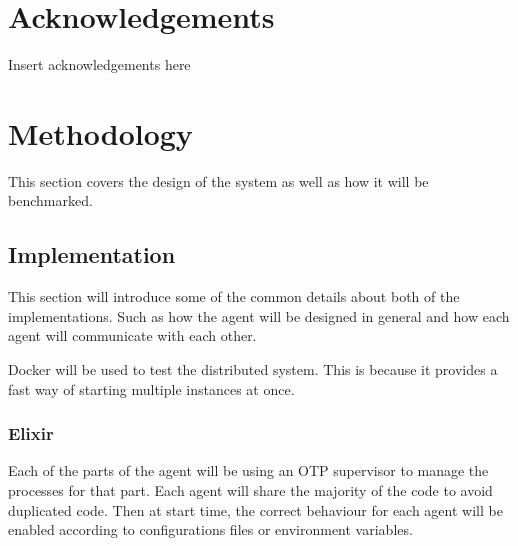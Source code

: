 \documentclass[12pt,a4paper]{article}
\begin{document}

\pagebreak

\pagebreak

\pagebreak

\begin{abstract}
\end{abstract}
\pagebreak

\tableofcontents
\newpage

\listoffigures
\newpage

\renewcommand\lstlistlistingname{List of Listings}
\lstlistoflistings{}
\newpage

\listoftables
\newpage

\section*{Acknowledgements}
Insert acknowledgements here
\subsection*{}
\newpage





\section{Methodology}

This section covers the design of the system as well as how it will be benchmarked.

\subsection{Implementation}

This section will introduce some of the common details about both of the implementations.
Such as how the agent will be designed in general and how each agent will communicate with each other.

Docker will be used to test the distributed system.
This is because it provides a fast way of starting multiple instances at once.

\subsubsection{Elixir}

Each of the parts of the agent will be using an OTP supervisor to manage the processes for that part.
Each agent will share the majority of the code to avoid duplicated code.
Then at start time, the correct behaviour for each agent will be enabled according to configurations files or environment variables.
\end{document}
